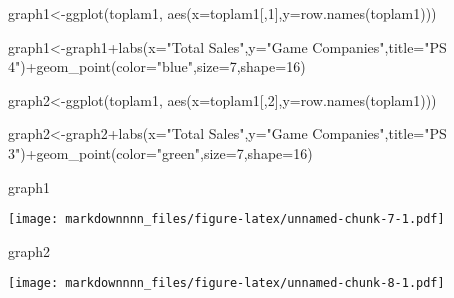 \documentclass[
]{article}
\newenvironment{Shaded}{\begin{snugshade}}{\end{snugshade}}
\newcommand{\AttributeTok}[1]{\textcolor[rgb]{0.77,0.63,0.00}{#1}}
\newcommand{\DecValTok}[1]{\textcolor[rgb]{0.00,0.00,0.81}{#1}}
\newcommand{\FunctionTok}[1]{\textcolor[rgb]{0.00,0.00,0.00}{#1}}
\newcommand{\NormalTok}[1]{#1}
\newcommand{\OtherTok}[1]{\textcolor[rgb]{0.56,0.35,0.01}{#1}}
\newcommand{\SpecialCharTok}[1]{\textcolor[rgb]{0.00,0.00,0.00}{#1}}
\newcommand{\StringTok}[1]{\textcolor[rgb]{0.31,0.60,0.02}{#1}}
\begin{document}
\begin{Shaded}
\begin{Highlighting}[]
\NormalTok{graph1}\OtherTok{\textless{}{-}}\FunctionTok{ggplot}\NormalTok{(toplam1, }\FunctionTok{aes}\NormalTok{(}\AttributeTok{x=}\NormalTok{toplam1[,}\DecValTok{1}\NormalTok{],}\AttributeTok{y=}\FunctionTok{row.names}\NormalTok{(toplam1)))}
  
\NormalTok{graph1}\OtherTok{\textless{}{-}}\NormalTok{graph1}\SpecialCharTok{+}\FunctionTok{labs}\NormalTok{(}\AttributeTok{x=}\StringTok{"Total Sales"}\NormalTok{,}\AttributeTok{y=}\StringTok{"Game Companies"}\NormalTok{,}\AttributeTok{title=}\StringTok{"PS 4"}\NormalTok{)}\SpecialCharTok{+}\FunctionTok{geom\_point}\NormalTok{(}\AttributeTok{color=}\StringTok{"blue"}\NormalTok{,}\AttributeTok{size=}\DecValTok{7}\NormalTok{,}\AttributeTok{shape=}\DecValTok{16}\NormalTok{)}

\NormalTok{graph2}\OtherTok{\textless{}{-}}\FunctionTok{ggplot}\NormalTok{(toplam1, }\FunctionTok{aes}\NormalTok{(}\AttributeTok{x=}\NormalTok{toplam1[,}\DecValTok{2}\NormalTok{],}\AttributeTok{y=}\FunctionTok{row.names}\NormalTok{(toplam1)))}
  
\NormalTok{graph2}\OtherTok{\textless{}{-}}\NormalTok{graph2}\SpecialCharTok{+}\FunctionTok{labs}\NormalTok{(}\AttributeTok{x=}\StringTok{"Total Sales"}\NormalTok{,}\AttributeTok{y=}\StringTok{"Game Companies"}\NormalTok{,}\AttributeTok{title=}\StringTok{"PS 3"}\NormalTok{)}\SpecialCharTok{+}\FunctionTok{geom\_point}\NormalTok{(}\AttributeTok{color=}\StringTok{"green"}\NormalTok{,}\AttributeTok{size=}\DecValTok{7}\NormalTok{,}\AttributeTok{shape=}\DecValTok{16}\NormalTok{)}
\end{Highlighting}
\end{Shaded}

\begin{Shaded}
\begin{Highlighting}[]
\NormalTok{graph1}
\end{Highlighting}
\end{Shaded}

\texttt{[image: markdownnnn\_files/figure-latex/unnamed-chunk-7-1.pdf]}

\begin{Shaded}
\begin{Highlighting}[]
\NormalTok{graph2}
\end{Highlighting}
\end{Shaded}

\texttt{[image: markdownnnn\_files/figure-latex/unnamed-chunk-8-1.pdf]}
\end{document}
